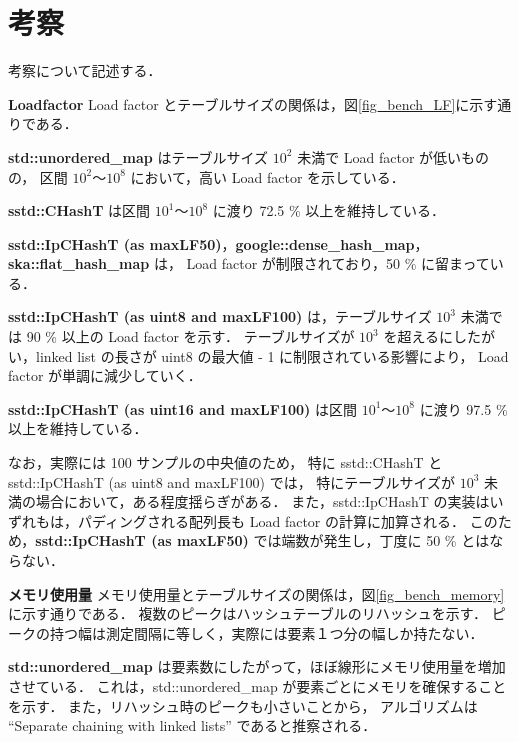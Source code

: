 \chapter{考察}
\label{chap_Discussion}

考察について記述する．
\leavevmode \newline

%
{\bf Loadfactor}
\samepage\newline\indent
Load factor とテーブルサイズの関係は，図\ref{fig_bench_LF}に示す通りである．

{\bf std::unordered\_map} はテーブルサイズ $10^2$ 未満で Load factor が低いものの，
区間 $10^2〜10^8$ において，高い Load factor を示している．

{\bf sstd::CHashT} は区間 $10^1〜10^8$ に渡り 72.5 \% 以上を維持している．

{\bf sstd::IpCHashT (as maxLF50)}，{\bf google::dense\_hash\_map}，{\bf ska::flat\_hash\_map} は，
Load factor が制限されており，50 \% に留まっている．

{\bf sstd::IpCHashT (as uint8 and maxLF100)} は，テーブルサイズ $10^3$ 未満では 90 \% 以上の Load factor を示す．
テーブルサイズが $10^3$ を超えるにしたがい，linked list の長さが uint8 の最大値 - 1 に制限されている影響により，
Load factor が単調に減少していく．

{\bf sstd::IpCHashT (as uint16 and maxLF100)} は区間 $10^1〜10^8$ に渡り 97.5 \% 以上を維持している．

なお，実際には 100 サンプルの中央値のため，
特に sstd::CHashT と sstd::IpCHashT (as uint8 and maxLF100) では，
特にテーブルサイズが $10^3$ 未満の場合において，ある程度揺らぎがある．
また，sstd::IpCHashT の実装はいずれもは，パディングされる配列長も Load factor の計算に加算される．
このため，{\bf sstd::IpCHashT (as maxLF50)} では端数が発生し，丁度に 50 \% とはならない．
\leavevmode \newline

%
{\bf メモリ使用量}
\samepage\newline\indent
メモリ使用量とテーブルサイズの関係は，図\ref{fig_bench_memory}に示す通りである．
複数のピークはハッシュテーブルのリハッシュを示す．
ピークの持つ幅は測定間隔に等しく，実際には要素１つ分の幅しか持たない．

{\bf std::unordered\_map} は要素数にしたがって，ほぼ線形にメモリ使用量を増加させている．
これは，std::unordered\_map が要素ごとにメモリを確保することを示す．
また，リハッシュ時のピークも小さいことから，
アルゴリズムは ``Separate chaining with linked lists'' であると推察される．

